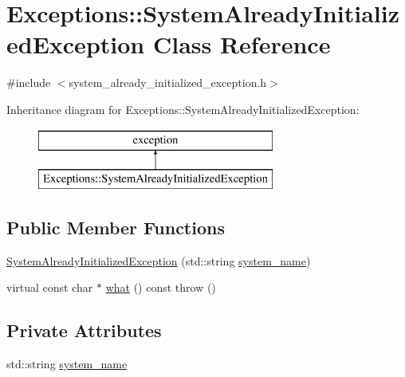\hypertarget{class_exceptions_1_1_system_already_initialized_exception}{}\section{Exceptions\+:\+:System\+Already\+Initialized\+Exception Class Reference}
\label{class_exceptions_1_1_system_already_initialized_exception}


{\ttfamily \#include $<$system\+\_\+already\+\_\+initialized\+\_\+exception.\+h$>$}

Inheritance diagram for Exceptions\+:\+:System\+Already\+Initialized\+Exception\+:\begin{figure}[H]
\begin{center}
\leavevmode
\includegraphics[height=2.000000cm]{class_exceptions_1_1_system_already_initialized_exception}
\end{center}
\end{figure}
\subsection*{Public Member Functions}
\begin{DoxyCompactItemize}
\item 
\hyperlink{class_exceptions_1_1_system_already_initialized_exception_a2f92ee1627417086ca29f3d58a8be520}{System\+Already\+Initialized\+Exception} (std\+::string \hyperlink{class_exceptions_1_1_system_already_initialized_exception_a858d81e072cf8a6a06a4fa506700fb32}{system\+\_\+name})
\item 
virtual const char $\ast$ \hyperlink{class_exceptions_1_1_system_already_initialized_exception_a28077450404b8dd5c89a348bc19ffa19}{what} () const   throw ()
\end{DoxyCompactItemize}
\subsection*{Private Attributes}
\begin{DoxyCompactItemize}
\item 
std\+::string \hyperlink{class_exceptions_1_1_system_already_initialized_exception_a858d81e072cf8a6a06a4fa506700fb32}{system\+\_\+name}
\end{DoxyCompactItemize}


